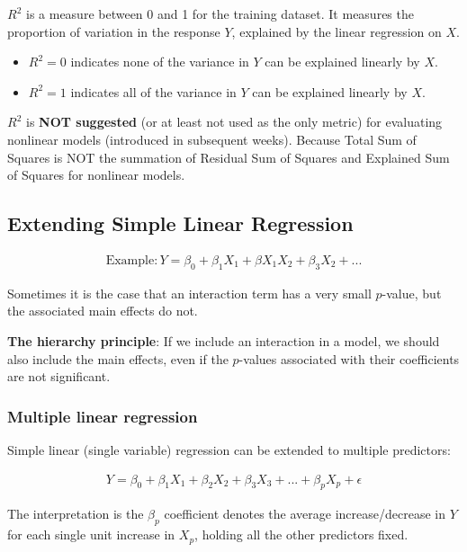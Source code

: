 $R^2$ is a measure between 0 and 1 for the training dataset. It measures the proportion of variation in the response $Y$, explained by the linear regression on $X$.

\begin{itemize}
    \item $R^2 = 0$ indicates none of the variance in $Y$ can be explained linearly by $X$.
    \item $R^2 = 1$ indicates all of the variance in $Y$ can be explained linearly by $X$.
\end{itemize}

$R^2$ is \textbf{NOT suggested} (or at least not used as the only metric) for evaluating nonlinear models (introduced in subsequent weeks). Because Total Sum of Squares is NOT the summation of Residual Sum of Squares and Explained Sum of Squares for nonlinear models.

\subsection{Extending Simple Linear Regression}

\begin{align*}
    \text{Example}: Y = \beta_0+\beta_1X_1+\beta X_1 X_2 + \beta_3 X_2 +...
\end{align*}

Sometimes it is the case that an interaction term has a very small $p$-value, but the associated main effects do not.

\textbf{The hierarchy principle}: If we include an interaction in a model, we should also include the main effects, even if the $p$-values associated with their coefficients are not significant.

\subsubsection{Multiple linear regression}

\indent 

Simple linear (single variable) regression can be extended to multiple predictors:

\begin{align*}
    Y = \beta_0 +\beta_1X_1+\beta_2X_2+\beta_3X_3+...+\beta_pX_p+\epsilon
\end{align*}

The interpretation is the $\beta_p$ coefficient denotes the average increase/decrease in $Y$ for each single unit increase in $X_p$, holding all the other predictors fixed.

